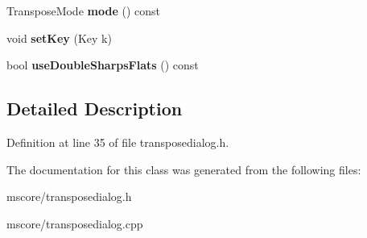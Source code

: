 \begin{DoxyCompactItemize}
\mbox{\label{class_ms_1_1_transpose_dialog_a5d823f0e36d45467e5c04dbcd5b97d50}} 
Transpose\+Mode {\bfseries mode} () const
\item 
\mbox{\label{class_ms_1_1_transpose_dialog_a3f6ada8ee1c17891cee21c421855a257}} 
void {\bfseries set\+Key} (Key k)
\item 
\mbox{\label{class_ms_1_1_transpose_dialog_a944af680b509ed43d71c18911c5b8c14}} 
bool {\bfseries use\+Double\+Sharps\+Flats} () const
\end{DoxyCompactItemize}


\subsection{Detailed Description}


Definition at line 35 of file transposedialog.\+h.



The documentation for this class was generated from the following files\+:\begin{DoxyCompactItemize}
\item 
mscore/transposedialog.\+h\item 
mscore/transposedialog.\+cpp\end{DoxyCompactItemize}
